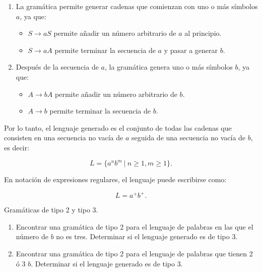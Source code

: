 \documentclass[12pt]{report} %
\begin{document}
\begin{enumerate}
\begin{solucion}[Ejercicio 2.c]
   \begin{enumerate}
       \item La gramática permite generar cadenas que comienzan con uno o más símbolos $a$, ya que:
           \begin{itemize}
               \item $S \to aS$ permite añadir un número arbitrario de $a$ al principio.
               \item $S \to aA$ permite terminar la secuencia de $a$ y pasar a generar $b$.
           \end{itemize}
       \item Después de la secuencia de $a$, la gramática genera uno o más símbolos $b$, ya que:
           \begin{itemize}
               \item $A \to bA$ permite añadir un número arbitrario de $b$.
               \item $A \to b$ permite terminar la secuencia de $b$.
           \end{itemize}
   \end{enumerate}

   Por lo tanto, el lenguaje generado es el conjunto de todas las cadenas que consisten en una secuencia no vacía de $a$ seguida de una secuencia no vacía de $b$, es decir:

   $$
   L = \{ a^n b^m \ | \ n \geq 1, m \geq 1 \}.
   $$

   En notación de expresiones regulares, el lenguaje puede escribirse como:

   $$
   L = a^+b^+.
   $$

   \end{solucion}
\end{enumerate}

\begin{ejercicio}
Gramáticas de tipo 2 y tipo 3. 

\begin{enumerate}[label=\alph*)]
    \item Encontrar una gramática de tipo 2 para el lenguaje de palabras en las que el número de $b$ no es tres.  
    Determinar si el lenguaje generado es de tipo 3.

    \item Encontrar una gramática de tipo 2 para el lenguaje de palabras que tienen 2 ó 3 $b$.  
    Determinar si el lenguaje generado es de tipo 3.
\end{enumerate}

\end{ejercicio}
\end{document}

